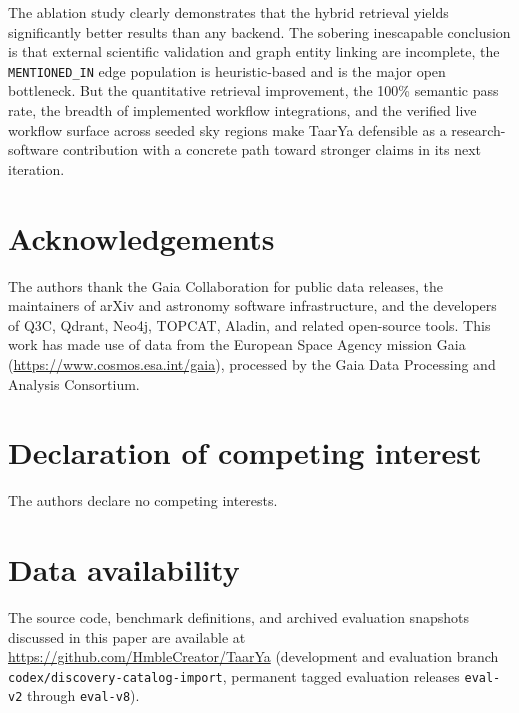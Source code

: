 \documentclass[preprint,12pt,authoryear]{elsarticle}
\begin{document}
The ablation study clearly demonstrates that the hybrid retrieval yields significantly better results than any backend. The sobering inescapable conclusion is that external scientific validation and graph entity linking are incomplete, the \texttt{MENTIONED\_IN} edge population is heuristic-based and is the major open bottleneck. But the quantitative retrieval improvement, the 100\% semantic pass rate, the breadth of implemented workflow integrations, and the verified live workflow surface across \nClusterNodes{} seeded sky regions make \textsf{TaarYa} defensible as a research-software contribution with a concrete path toward stronger claims in its next iteration.

\section*{Acknowledgements}

The authors thank the Gaia Collaboration for public data releases, the maintainers of arXiv and astronomy software infrastructure, and the developers of Q3C, Qdrant, Neo4j, TOPCAT, Aladin, and related open-source tools. This work has made use of data from the European Space Agency mission Gaia (\url{https://www.cosmos.esa.int/gaia}), processed by the Gaia Data Processing and Analysis Consortium.

\section*{Declaration of competing interest}
The authors declare no competing interests.

\section*{Data availability}
The source code, benchmark definitions, and archived evaluation snapshots discussed in this paper are available at \url{https://github.com/HmbleCreator/TaarYa} (development and evaluation branch \texttt{codex/discovery-catalog-import}, permanent tagged evaluation releases \texttt{eval-v2} through \texttt{eval-v8}).




\appendix
\end{document}

